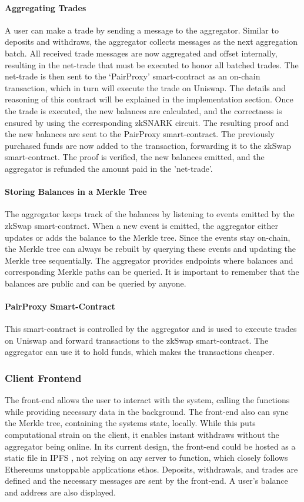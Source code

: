 \documentclass[../../thesis.tex]{subfiles}
\begin{document}
\paragraph{Aggregating Trades}
A user can make a trade by sending a message to the aggregator. Similar to deposits and withdraws, the aggregator collects messages as the next aggregation batch. All received trade messages are now aggregated and offset internally, resulting in the net-trade that must be executed to honor all batched trades. The net-trade is then sent to the `PairProxy' smart-contract as an on-chain transaction, which in turn will execute the trade on Uniswap. The details and reasoning of this contract will be explained in the implementation section. Once the trade is executed, the new balances are calculated, and the correctness is ensured by using the corresponding zkSNARK circuit. The resulting proof and the new balances are sent to the PairProxy smart-contract. The previously purchased funds are now added to the transaction, forwarding it to the zkSwap smart-contract. The proof is verified, the new balances emitted, and the aggregator is refunded the amount paid in the 'net-trade'. 

\paragraph{Storing Balances in a Merkle Tree}
The aggregator keeps track of the balances by listening to events emitted by the zkSwap smart-contract. When a new event is emitted, the aggregator either updates or adds the balance to the Merkle tree. Since the events stay on-chain, the Merkle tree can always be rebuilt by querying these events and updating the Merkle tree sequentially. The aggregator provides endpoints where balances and corresponding Merkle paths can be queried. It is important to remember that the balances are public and can be queried by anyone.

\paragraph{PairProxy Smart-Contract}
This smart-contract is controlled by the aggregator and is used to execute trades on Uniswap and forward transactions to the zkSwap smart-contract. The aggregator can use it to hold funds, which makes the transactions cheaper. 

\subsubsection{Client Frontend}
The front-end allows the user to interact with the system, calling the functions while providing necessary data in the background. The front-end also can sync the Merkle tree, containing the systems state, locally. While this puts computational strain on the client, it enables instant withdraws without the aggregator being online. In its current design, the front-end could be hosted as a static file in IPFS \cite{benet2014ipfs}, not relying on any server to function, which closely follows Ethereums unstoppable applications ethos. Deposits, withdrawals, and trades are defined and the necessary messages are sent by the front-end. A user's balance and address are also displayed. 
\end{document}
